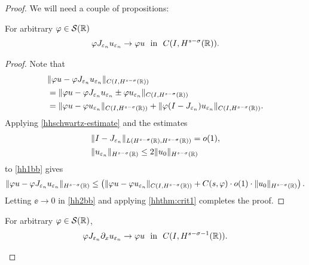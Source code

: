 \begin{proof} We will need a couple of propositions:
\begin{proposition}
For arbitrary $\varphi \in \mathcal{S}(\mathbb{R})$
\label{hhprop:1aa}
\begin{equation}
\begin{split}
\varphi J_{\varepsilon_n} u_{\varepsilon_n} \to \varphi u \ \ \text{in} \ \
C(I, H^{s-\sigma}(\mathbb{R})).
\label{hh}
\end{split}
\end{equation}
\end{proposition}
\begin{proof}
Note that
\begin{equation}
\begin{split}
& \|\varphi u - \varphi J_{\varepsilon_n} u_{\varepsilon_n}
\|_{C(I, H^{s-\sigma}(\mathbb{R}))}
\\
&= \|\varphi u - \varphi J_{\varepsilon_n} u_{\varepsilon_n} \pm \varphi
u_{\varepsilon_n} \|_{C(I, H^{s-\sigma}(\mathbb{R}))}
\\
& = \|\varphi u - \varphi u_{\varepsilon_n}
\|_{C(I, H^{s-\sigma}(\mathbb{R}))} + \|\varphi (I - J_{\varepsilon_n})
u_{\varepsilon_n} \|_{C(I, H^{s-\sigma}(\mathbb{R}))}.
\label{hh1bb}
\end{split}
\end{equation}
Applying \eqref{hhschwartz-estimate} and the estimates
\begin{equation*}
\begin{split}
& \|I-J_{\varepsilon_n} \|_{L(H^{s-\sigma}(\mathbb{R}), H^{s -
\sigma}(\mathbb{R}))} = o(1),
\\
& \|u_{\varepsilon_n}\|_{H^{s-\sigma}(\mathbb{R})} \le 2
\|u_0\|_{H^{s-\sigma}(\mathbb{R})}
\end{split}
\end{equation*}
to \eqref{hh1bb} gives
\begin{equation}
\label{hh2bb}
\begin{split}
\|\varphi u - \varphi J_{\varepsilon_n} u_{\varepsilon_n}\|_{H^{s-\sigma}(\mathbb{R})}
\le \left( \|\varphi u - \varphi u_{\varepsilon_n}
\|_{C(I, H^{s-\sigma}(\mathbb{R}))} + C(s, \varphi) \cdot o(1) \cdot \|u_0
\|_{H^{s-\sigma}(\mathbb{R})} \right).
\end{split}
\end{equation}
Letting $\ee \to 0$ in \eqref{hh2bb} and applying \cref{hhthm:crit1} completes
the proof.
\end{proof}
%
%
\begin{proposition}
\label{hhprop:dd}
For arbitrary $ \varphi \in \mathcal{S}(\mathbb{R})$,
\begin{equation}
\begin{split}
\vp J_{\ee_n} \p_x u_{\ee_n} \to \vp u \ \
\text{in} \ \ C(I, H^{s-\sigma-1}(\rr)).
\label{hh0dd}

\end{split}
\end{equation}
\end{proposition}
\end{proof}
